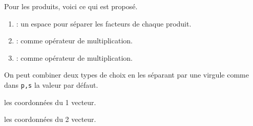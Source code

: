 \documentclass[12pt,a4paper]{article}
\begin{document}
            Pour les produits, voici ce qui est proposé.
\begin{enumerate}
	\item {} : un espace pour séparer les facteurs de chaque produit.

	\item {} :  comme opérateur de multiplication.

	\item {} :  comme opérateur de multiplication.
\end{enumerate}

            On peut combiner deux types de choix en les séparant par une virgule comme dans \verb+p,s+ la valeur par défaut.


 les coordonnées du 1\ier{} vecteur.

 les coordonnées du 2\ieme{} vecteur.
\end{document}
